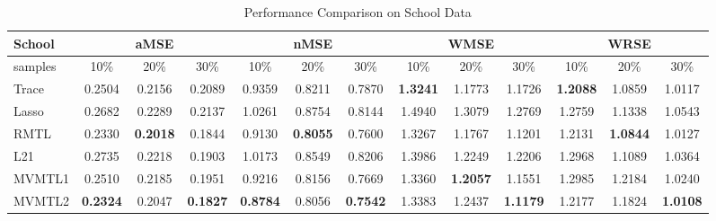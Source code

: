 \documentclass{article}
\newcounter{ass_counter}
\begin{document}
%
\begin{table}[htb]
\begin{tabular}{|p{1cm}|c|c|c|c|c|c|c|c|c|c|c|c|}
\hline 
\small School& \multicolumn{3}{c|}{aMSE} & \multicolumn{3}{c|}{nMSE} & \multicolumn{3}{c|}{WMSE} & \multicolumn{3}{c|}{WRSE}\tabularnewline
\hline 
\tiny samples & 10\% & 20\% & 30\% & 10\% & 20\% & 30\% & 10\% & 20\% & 30\% & 10\% & 20\% & 30\%\tabularnewline
\hline 
\tiny Trace & 0.2504 & 0.2156 & 0.2089 & 0.9359 & 0.8211 & 0.7870 & \textbf{1.3241} & 1.1773 & 1.1726 & \small \textbf{1.2088} & 1.0859 & 1.0117\tabularnewline
\hline 
\tiny Lasso & 0.2682 & 0.2289 & 0.2137 & 1.0261 & 0.8754 & 0.8144 & 1.4940 & 1.3079 & 1.2769 & 1.2759 & 1.1338 & 1.0543\tabularnewline
\hline 
\tiny RMTL & 0.2330 & \small\textbf{0.2018} & 0.1844 & 0.9130 &\small\textbf{ 0.8055} & 0.7600 & 1.3267 & 1.1767 & 1.1201 & 1.2131 & \small\textbf{1.0844} & 1.0127\tabularnewline
\hline 
\tiny L21 & 0.2735  & 0.2218 & 0.1903  & 1.0173 & 0.8549 & 0.8206 & 1.3986 & 1.2249 & 1.2206 & 1.2968 & 1.1089 & 1.0364\tabularnewline
\hline 
\tiny MVMTL1 & 0.2510  & 0.2185 & 0.1951  & 0.9216 & 0.8156 & 0.7669 & 1.3360 & \textbf{1.2057} & 1.1551 & 1.2985 & 1.2184 & 1.0240\tabularnewline
\hline 
\tiny MVMTL2 & \small\textbf{0.2324}  & 0.2047 & \small\textbf{0.1827}  & \small\textbf{0.8784} & 0.8056 & \small\textbf{0.7542} & 1.3383 & 1.2437 & \small\textbf{1.1179} & 1.2177 & 1.1824 & \small\textbf{1.0108}\tabularnewline
\hline 
\end{tabular}
\caption{Performance Comparison on School Data}
\label{tab:per_school}
\end{table}
\end{document}
